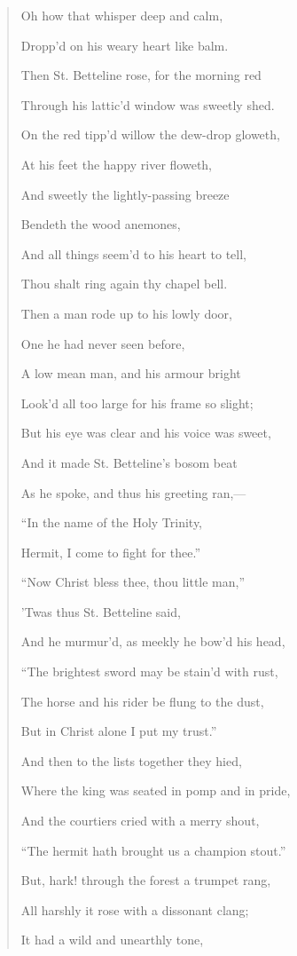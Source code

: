 \begin{quote}
Oh how that whisper deep and calm,

Dropp'd on his weary heart like balm.

Then St. Betteline rose, for the morning red

Through his lattic'd window was sweetly shed. 

On the red tipp'd willow the dew-drop gloweth,

At his feet the happy river floweth,

And sweetly the lightly-passing breeze

Bendeth the wood anemones,

And all things seem'd to his heart to tell,

Thou shalt ring again thy chapel bell.

Then a man rode up to his lowly door,

One he had never seen before,

A low mean man, and his armour bright

Look'd all too large for his frame so slight;

But his eye was clear and his voice was sweet,

And it made St. Betteline's bosom beat

As he spoke, and thus his greeting ran,—

``In the name of the Holy Trinity,

Hermit, I come to fight for thee.''

``Now Christ bless thee, thou little man,''

'Twas thus St. Betteline said,

And he murmur'd, as meekly he bow'd his head,

``The brightest sword may be stain'd with rust,

The horse and his rider be flung to the dust,

But in Christ alone I put my trust.''

And then to the lists together they hied,

Where the king was seated in pomp and in pride,

And the courtiers cried with a merry shout,

``The hermit hath brought us a champion stout.''

But, hark! through the forest a trumpet rang,

All harshly it rose with a dissonant clang;

It had a wild and unearthly tone,


\end{quote}
